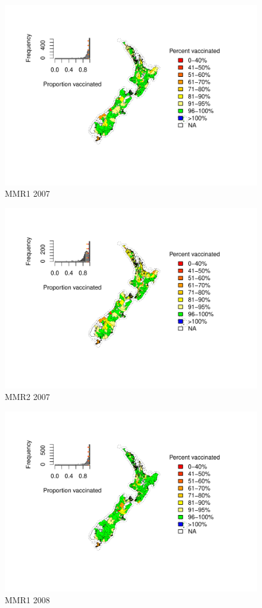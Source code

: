 \documentclass{article}
\begin{document}
\begin{figure}
    \centering
    \includegraphics[width=5.0in]{nir_census_MMR1_NIR_2007.pdf}
    \caption{MMR1 2007}
\end{figure}

\begin{figure}
    \centering
    \includegraphics[width=5.0in]{nir_census_MMR2_NIR_2007.pdf}
    \caption{MMR2 2007}
\end{figure}


\begin{figure}
    \centering
    \includegraphics[width=5.0in]{nir_census_MMR1_NIR_2008.pdf}
    \caption{MMR1 2008}
\end{figure}
\end{document}
